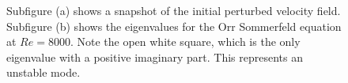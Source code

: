 \begin{figure}
 \centering
 \caption{Subfigure (a) shows a snapshot of the initial perturbed velocity field. Subfigure (b) shows the eigenvalues for the Orr Sommerfeld equation at $Re=8000$. Note the open white square, which is the only eigenvalue with a positive imaginary part. This represents an unstable mode.}
 \label{fig:OS_init}
\end{figure}

